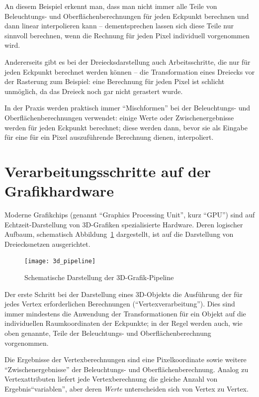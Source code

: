 \documentclass[twoside,a4paper,fleqn,12pt]{book}
\begin{document}
An diesem Beispiel erkennt man, dass man nicht immer alle Teile von Beleuchtungs- und Oberflächenberechnungen für jeden Eckpunkt berechnen und
dann linear interpolieren kann -- dementsprechen lassen sich diese Teile nur sinnvoll berechnen, wenn die Rechnung für jeden Pixel individuell vorgenommen wird.

Andererseits gibt es bei der Dreiecksdarstellung auch Arbeitsschritte, die nur für jeden Eckpunkt berechnet werden können -- die Transformation eines
Dreiecks vor der Rasterung zum Beispiel: eine Berechnung für jeden Pixel ist schlicht unmöglich, da das Dreieck noch gar nicht gerastert wurde.

In der Praxis werden praktisch immer "`Mischformen"' bei der Beleuchtungs- und Oberflächenberechnungen verwendet: einige Werte oder
Zwischenergebnisse werden für jeden Eckpunkt berechnet; diese werden dann, bevor sie als Eingabe für eine für ein Pixel auszuführende
Berechnung dienen, interpoliert.

\section{Verarbeitungsschritte auf der Grafikhardware}
\label{hw_steps}

Moderne Grafikchips (genannt ``Graphics Processing Unit'', kurz ``GPU'') sind auf Echtzeit-Darstellung von 3D-Grafiken spezialisierte Hardware.
Deren logischer Aufbaum, schematisch Abbildung~\ref{fig:3d_pipeline} dargestellt, ist auf die Darstellung von Dreiecksnetzen ausgerichtet. 

\begin{figure}[h]
  \centering
  \texttt{[image: 3d\_pipeline]}
  \caption{Schematische Darstellung der 3D-Grafik-Pipeline}
  \label{fig:3d_pipeline}
\end{figure}

Der erste Schritt bei der Darstellung
eines 3D-Objekts die Ausführung der für jedes Vertex erforderlichen Berechnungen ("`Vertexverarbeitung"').
Dies sind immer mindestens die Anwendung der Transformationen für ein Objekt auf die individuellen Raumkoordinaten der Eckpunkte;
in der Regel werden auch, wie oben genannte, Teile der Beleuchtungs- und Oberflächenberechnung vorgenommen.

Die Ergebnisse der Vertexberechnungen sind eine Pixelkoordinate sowie weitere "`Zwischenergebnisse"' der Beleuchtungs- und Oberflächenberechnung.
Analog zu Vertexattributen liefert jede Vertexberechnung die gleiche Anzahl von Ergebnis"`variablen"', aber deren \emph{Werte} unterscheiden sich
von Vertex zu Vertex.
\end{document}
